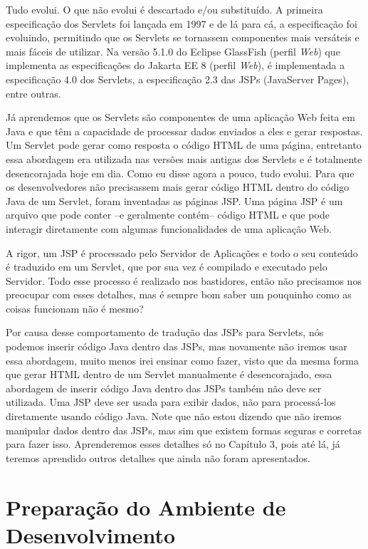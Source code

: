 Tudo evolui. O que não evolui é descartado e/ou substituído. A primeira especificação dos Servlets foi lançada em 1997 e de lá para cá, a especificação foi evoluindo, permitindo que os Servlets se tornassem componentes mais versáteis e mais fáceis de utilizar. Na versão 5.1.0 do Eclipse GlassFish (perfil \textit{Web}) que implementa as especificações do Jakarta EE 8 (perfil \textit{Web}), é implementada a especificação 4.0 dos Servlets, a especificação 2.3 das JSPs (JavaServer Pages), entre outras.

Já aprendemos que os Servlets são componentes de uma aplicação Web feita em Java e que têm a capacidade de processar dados enviados a eles e gerar respostas. Um Servlet pode gerar como resposta o código HTML de uma página, entretanto essa abordagem era utilizada nas versões mais antigas dos Servlets e é totalmente desencorajada hoje em dia. Como eu disse agora a pouco, tudo evolui. Para que os desenvolvedores não precisassem mais gerar código HTML dentro do código Java de um Servlet, foram inventadas as páginas JSP. Uma página JSP é um arquivo que pode conter –e geralmente contém– código HTML e que pode interagir diretamente com algumas funcionalidades de uma aplicação Web.

A rigor, um JSP é processado pelo Servidor de Aplicações e todo o seu conteúdo é traduzido em um Servlet, que por sua vez é compilado e executado pelo Servidor. Todo esse processo é realizado nos bastidores, então não precisamos nos preocupar com esses detalhes, mas é sempre bom saber um pouquinho como as coisas funcionam não é mesmo?

Por causa desse comportamento de tradução das JSPs para Servlets, nós podemos inserir código Java dentro das JSPs, mas novamente não iremos usar essa abordagem, muito menos irei ensinar como fazer, visto que da mesma forma que gerar HTML dentro de um Servlet manualmente é desencorajado, essa abordagem de inserir código Java dentro das JSPs também não deve ser utilizada. Uma JSP deve ser usada para exibir dados, não para processá-los diretamente usando código Java. Note que não estou dizendo que não iremos manipular dados dentro das JSPs, mas sim que existem formas seguras e corretas para fazer isso. Aprenderemos esses detalhes só no Capítulo 3, pois até lá, já teremos aprendido outros detalhes que ainda não foram apresentados.


\section{Preparação do Ambiente de Desenvolvimento}

